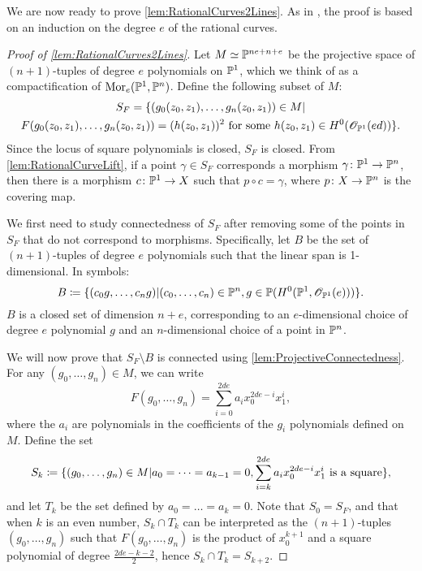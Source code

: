 We are now ready to prove \cref{lem:RationalCurves2Lines}. As in \cite{TZ}, the proof is based on an induction on the degree $e$ of the rational curves.

\begin{proof}[Proof of \cref{lem:RationalCurves2Lines}]
Let $M \simeq \P^{ne + n + e}$ be the projective space of $(n+1)$-tuples of degree $e$ polynomials on $\P^1$, which we think of as a compactification of $\Mor_e(\P^1,\P^n)$. Define the following subset of $M$:
\begin{gather*}
  S_F = \set{(g_0(z_0,z_1),\dots,g_n(z_0,z_1)) \in M \vert \\
    F(g_0(z_0,z_1),\dots,g_n(z_0,z_1)) = (h(z_0,z_1))^2 \text{ for some } h(z_0,z_1) \in H^0(\sO_{\P^1}(ed))}.
\end{gather*}
Since the locus of square polynomials is closed, $S_F$ is closed.
From \cref{lem:RationalCurveLift},  if a point $\gamma \in S_F$ corresponds a morphism $\gamma \from \P^1 \to \P^n$, then there is a morphism $c \from \P^1 \to X$ such that $p \circ c = \gamma$, where $p \from X \to \P^n$ is the covering map.

We first need to study connectedness of $S_F$ after removing some of the points in $S_F$ that do not correspond to morphisms. Specifically, let $B$ be the set of $(n+1)$-tuples of degree $e$ polynomials such that the linear span is 1-dimensional. In symbols:
\[B \coloneqq \set{(c_0g,\dots,c_ng) \vert (c_0,\dots,c_n) \in \P^n,g \in \P(H^0(\P^1,\sO_{\P^1}(e)))}.\]
$B$ is a closed set of dimension $n+e$, corresponding to an $e$-dimensional choice of degree $e$ polynomial $g$ and an $n$-dimensional choice of a point in $\P^n$.

 We will now prove that $S_F \setminus B$ is connected using \cref{lem:ProjectiveConnectedness}. For any $(g_0,\dots,g_n) \in M$, we can write 
\begin{equation}
  \label{eq:FCoefficientForm}
  F(g_0,\dots,g_n) = \sum_{i=0}^{2de}a_ix_0^{2de-i}x_1^i,
\end{equation}
where the $a_i$ are polynomials in the coefficients of the $g_i$ \ie polynomials defined on $M$. Define the set
\[S_k \coloneqq \set{(g_0,\dots,g_n) \in M \vert a_0 = \cdots = a_{k-1} = 0, \sum_{i=k}^{2de} a_ix_0^{2de-i}x_1^i \text{ is a square}}, \]
and let $T_k$ be the set defined by $a_0 = \dots = a_k = 0$.
Note that $S_0 = S_F$, and that when $k$ is an even number, $S_k \cap T_k$ can be interpreted as the $(n+1)$-tuples $(g_0,\dots,g_n)$ such that $F(g_0,\dots,g_n)$ is the product of $x_0^{k+1}$ and a square polynomial of degree $\frac{2de-k-2}{2}$, hence $S_k \cap T_k = S_{k+2}$. 


\end{proof}
